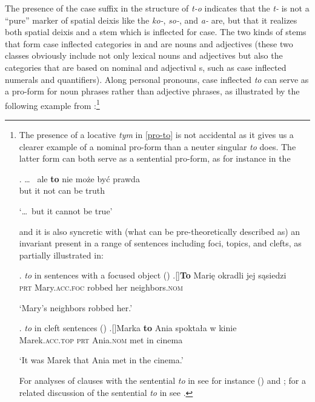 The presence of the case suffix in the structure of \textit{t-o} indicates that the \textit{t-} is not a ``pure'' marker of spatial deixis like the  \textit{ko-}, \textit{so-}, and \textit{a-} are, but that it realizes both spatial deixis and a stem which is inflected for case. The two kinds of stems that form case inflected categories in  and  are nouns and adjectives (these two classes obviously include not only lexical nouns and adjectives but also the categories that are based on nominal and adjectival s, such as case inflected numerals and quantifiers). Along personal pronouns, case inflected \textit{to} can serve as a pro-form for noun phrases rather than adjective phrases, as illustrated by the following example from :\footnote{The presence of a locative \textit{tym} in \ref{pro-to} is not accidental as it gives us a clearer example of a nominal pro-form than a neuter singular \textit{to} does. The latter form can both serve as a sentential pro-form, as for instance in the  

\noindent\parbox{\linguexfootnotewidth}{\exg. {\ldots} \ ale \textbf{to} nie mo\.ze by\'c prawda\\
{} but it not can be truth\\
\strut  `\ldots \ but it cannot be true'

} and it is also syncretic with (what can be pre-theoretically described as) an invariant  present in a range of sentences including foci, topics, and clefts, as partially illustrated in:

\noindent\parbox{\linguexfootnotewidth}{\ex.  \textit{to} in sentences with a focused object (\citealt[147]{Wiland2016})
\ag.[]\hspace{-22pt}\textbf{To} Mari\k{e} okradli jej s\k{a}siedzi\\
\hspace{-22pt}\textsc{prt} Mary.\textsc{acc.foc}  robbed her neighbors.\textsc{nom}\\
\hspace{-22pt}\strut `Mary's neighbors robbed her.'

\ex.  \textit{to} in cleft sentences (\citealt[354]{Tajsner2008})
\ag.[]\hspace{-22pt}Marka \textbf{to} Ania spokta\l a w kinie\\
\hspace{-22pt}Marek.\textsc{acc.top} \textsc{prt} Ania.\textsc{nom} met in cinema\\
\hspace{-22pt}\strut `It was Marek that Ania met in the cinema.'  

} For analyses of clauses with the sentential \textit{to} in  see for instance \citeauthor{Tajsner2008} (\citeyear{Tajsner2008,Tajsner2015,Tajsner2018}) and \cite{Mokrosz2014}; for a related discussion of the sentential \textit{to} in  see \cite{Simik2009}.      
} %

